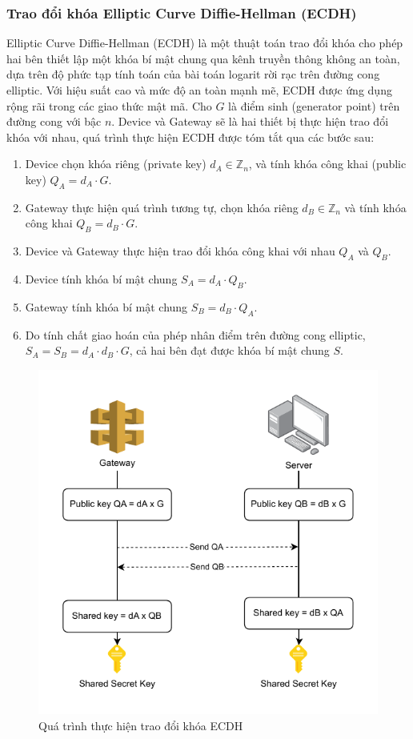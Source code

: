 \subsubsection{Trao đổi khóa Elliptic Curve Diffie-Hellman (ECDH)}
\label{sec:ecdh}
Elliptic Curve Diffie-Hellman (ECDH) là một thuật toán trao đổi khóa cho phép hai bên thiết lập một khóa bí mật chung qua kênh truyền thông không an toàn, dựa trên độ phức tạp tính toán của bài toán logarit rời rạc trên đường cong elliptic. Với hiệu suất cao và mức độ an toàn mạnh mẽ, ECDH được ứng dụng rộng rãi trong các giao thức mật mã. Cho \( G \) là điểm sinh (generator point) trên đường cong với bậc \( n \). Device và Gateway sẽ là hai thiết bị thực hiện trao đổi khóa với nhau, quá trình thực hiện ECDH được tóm tắt qua các bước sau:
\begin{enumerate}
    \item Device chọn khóa riêng (private key) \( d_A \in \mathbb{Z}_n \), và tính khóa công khai (public key) \( Q_A = d_A \cdot G \).
    \item Gateway thực hiện quá trình tương tự, chọn khóa riêng  \( d_B \in \mathbb{Z}_n \) và tính khóa công khai \( Q_B = d_B \cdot G \).
    \item Device và Gateway thực hiện trao đổi khóa công khai với nhau \( Q_A \) và \( Q_B \).
    \item Device tính khóa bí mật chung \( S_A = d_A \cdot Q_B \).
    \item Gateway tính khóa bí mật chung  \( S_B = d_B \cdot Q_A \).
    \item Do tính chất giao hoán của phép nhân điểm trên đường cong elliptic, \( S_A = S_B = d_A \cdot d_B \cdot G \), cả hai bên đạt được khóa bí mật chung \( S \).
\end{enumerate}
\begin{figure}[h]
    \centering
    \includegraphics[width=0.65\linewidth]{images/keyexchange.pdf}
    \caption{Quá trình thực hiện trao đổi khóa ECDH}
    \label{fig:curve}
\end{figure}

